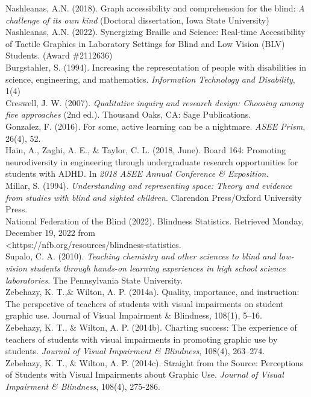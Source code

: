 \documentclass[11.5pt]{sig-alternate}
\begin{document}
\begin{large}
Nashleanas, A.N.  (2018). Graph accessibility and comprehension for the blind: \textit{A challenge of its own kind} (Doctoral dissertation, Iowa State University)\\

Nashleanas, A.N. (2022). Synergizing Braille and Science: Real-time Accessibility of Tactile Graphics in Laboratory Settings for Blind and Low Vision (BLV) Students. (Award \#2112636)\\

Burgstahler, S. (1994). Increasing the representation of people with disabilities in science, engineering, and mathematics. \textit{Information Technology and Disability}, 1(4)\\

Creswell, J. W. (2007).\textit{ Qualitative inquiry and research design: Choosing among five approaches} (2nd ed.). Thousand Oaks, CA: Sage Publications.\\

Gonzalez, F. (2016). For some, active learning can be a nightmare. \textit{ASEE Prism}, 26(4), 52.\\

Hain, A., Zaghi, A. E., \& Taylor, C. L. (2018, June). Board 164: Promoting neurodiversity in engineering through undergraduate research opportunities for students with ADHD. In \textit{2018 ASEE Annual Conference \& Exposition}.\\

Millar, S. (1994). \textit{Understanding and representing space: Theory and evidence from studies with blind and sighted children}. Clarendon Press/Oxford University Press.\\

National Federation of the Blind (2022). Blindness Statistics. Retrieved Monday, December 19, 2022 from \\<https://nfb.org/resources/blindness-statistics.\\

Supalo, C. A. (2010). \textit{Teaching chemistry and other sciences to blind and low-vision students through hands-on learning experiences in high school science laboratories}. The Pennsylvania State University.\\

Zebehazy, K. T.,\& Wilton, A. P. (2014a). Quality, importance, and instruction: The perspective of teachers of students with visual impairments on student graphic use. Journal of Visual Impairment \& Blindness, 108(1), 5–16.\\

Zebehazy, K. T., \& Wilton, A. P. (2014b). Charting success: The experience of teachers of students with visual impairments in promoting graphic use by students.\textit{ Journal of Visual Impairment \& Blindness}, 108(4), 263–274.\\

Zebehazy, K. T., \& Wilton, A. P. (2014c). Straight from the Source: Perceptions of Students with Visual Impairments about Graphic Use. \textit{Journal of Visual Impairment \& Blindness}, 108(4), 275-286.\\

\end{large}
\end{document}
